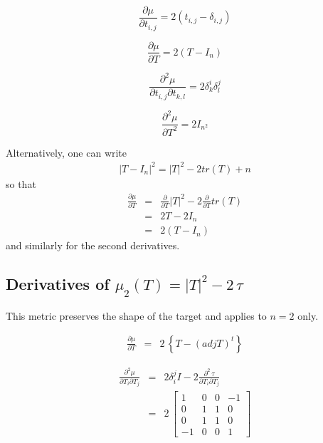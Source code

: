 \documentclass{report}
\begin{document}
\begin{equation}
\frac{\partial \mu}{\partial t_{i,j}} = 2 (t_{i,j} - \delta_{i,j})
\end{equation}

\begin{equation}
\frac{\partial \mu}{\partial T} = 2(T - I_n)
\end{equation}


\begin{equation}
\frac{\partial^2 \mu}{\partial t_{i,j} \partial t_{k,l}} = 2 \delta^i_k \delta^j_l \end{equation}

\begin{equation}
\frac{\partial^2 \mu}{\partial T^2} = 2 I_{n^2}
\end{equation}
 
\noindent Alternatively, one can write
\begin{eqnarray}
|T-I_n|^2 = |T|^2 - 2 tr(T) + n
\end{eqnarray}
so that 
\begin{eqnarray}
\frac{\partial \mu}{\partial T} & = & \frac{\partial}{\partial T} |T|^2 - 2 \frac{\partial}{\partial T} tr(T) \nonumber \\
 & = & 2 T - 2 I_n \nonumber \\
 & = & 2 (T-I_n)
\end{eqnarray}
and similarly for the second derivatives. \newline

\subsection{Derivatives of $\mu_2(T)=|T|^2 - 2 \, \tau$ \label{2ds}}

This metric preserves the shape of the target and applies to $n=2$ only. \newline

\begin{eqnarray}
\frac{\partial \mu}{\partial T} & = & 2 \, \left\{ T- (adj T)^t \right\}
\end{eqnarray}

\begin{eqnarray}
\frac{\partial^2 \mu}{\partial T_i \partial T_j} & = & 2 \delta_i^j I - 2 \frac{\partial^2 \, \tau}{\partial T_i \partial T_j} \nonumber \\
 & = & 2 \, \left[ \begin{array}{cccc}
1 & 0 & 0 & -1 \\
0 & 1 & 1 & 0 \\
0 & 1 & 1 & 0 \\
-1 & 0 & 0 & 1 
\end{array} \right]
\end{eqnarray}
\end{document}
